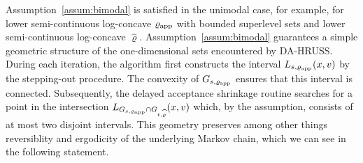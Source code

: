 \documentclass[sn-mathphys-num]{sn-jnl}%
\theoremstyle{thmstyleone}%
\theoremstyle{thmstyletwo}%
\newtheorem{example}{Example}%
\theoremstyle{thmstylethree}%
\newcommand{\rhoapp}{\varrho_{{\rm app}}}
\newcommand{\change}[1]{\bgroup\color{black}#1\egroup}    %
\begin{document}
\change{%
Assumption~\ref{assum:bimodal} is satisfied in the unimodal case, for example, for lower semi-continuous log-concave $\rhoapp$ with bounded superlevel sets and lower semi-continuous log-concave $\widehat{\varrho}$.}
\change{Assumption~\ref{assum:bimodal} guarantees a simple geometric structure of the one-dimensional sets encountered by DA-HRUSS. During each iteration, the algorithm first constructs the interval $L_{s,\rhoapp}(x,v)$ by the stepping-out procedure. 
The convexity of $G_{s,\rhoapp}$ ensures that this interval is connected. Subsequently, the delayed acceptance shrinkage routine searches for a point in the intersection $L_{G_{s,\rhoapp}\cap G_{t,\widehat{\varrho}}}(x,v)$ which, by the assumption, consists of at most two disjoint intervals. This geometry preserves among other things reversiblity and ergodicity of the underlying Markov chain, which we can see in the following statement.}

\end{document}
